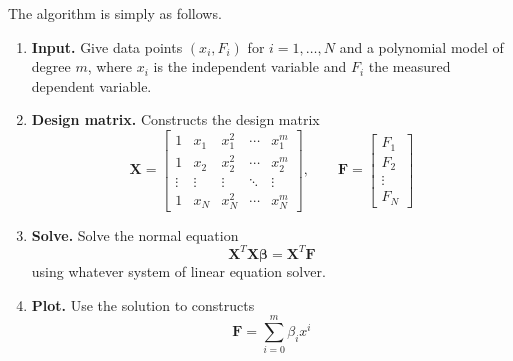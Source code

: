 \documentclass[../../../main.tex]{subfiles}
\begin{document}
The algorithm is simply as follows.
\begin{enumerate}
    \item \textbf{Input.} Give data points \((x_i, F_i)\) for \(i = 1, \dots, N\) and a polynomial model of degree \(m\), where $x_i$ is the independent variable and $F_i$ the measured dependent variable.


    \item \textbf{Design matrix.} Constructs the design matrix
          \begin{equation*}
              \mathbf{X} =
              \begin{bmatrix}
                  1      & x_1    & x_1^2  & \cdots & x_1^m  \\
                  1      & x_2    & x_2^2  & \cdots & x_2^m  \\
                  \vdots & \vdots & \vdots & \ddots & \vdots \\
                  1      & x_N    & x_N^2  & \cdots & x_N^m
              \end{bmatrix},
              \qquad
              \mathbf{F} =
              \begin{bmatrix}
                  F_1 \\ F_2 \\ \vdots \\ F_N
              \end{bmatrix}
          \end{equation*}


    \item \textbf{Solve.} Solve the normal equation
          \begin{equation*}
              \mathbf{X}^{T}\mathbf{X}\boldsymbol{\beta} = \mathbf{X}^{T}\mathbf{F}
          \end{equation*}
          using whatever system of linear equation solver.


    \item \textbf{Plot.} Use the solution to constructs
          \begin{equation*}
              \mathbf{F} = \sum_{i=0}^{m} \beta_i x^i
          \end{equation*}
\end{enumerate}
\end{document}

